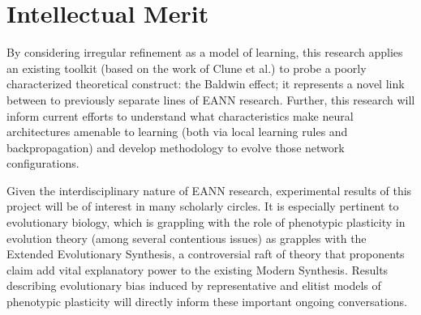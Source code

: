 \section{Intellectual Merit}
By considering irregular refinement as a model of learning, this research applies an existing toolkit (based on the work of Clune et al.) to probe a poorly characterized theoretical construct: the Baldwin effect;
it represents a novel link between to previously separate lines of EANN research.\autocite{Clune2011OnRegularity,Downing2010TheNetworks}
Further, this research will inform current efforts to understand what characteristics make neural architectures amenable to learning (both via local learning rules and backpropagation) and develop methodology to evolve those network configurations.

Given the interdisciplinary nature of EANN research, experimental results of this project will be of interest in many scholarly circles.
It is especially pertinent to evolutionary biology, which is grappling with the role of phenotypic plasticity in evolution theory (among several contentious issues) as grapples with the Extended Evolutionary Synthesis, a controversial raft of theory that proponents claim add vital explanatory power to the existing Modern Synthesis.\autocite{Pigliucci2008IsEvolvable, Laland2014DoesRethink}
Results describing evolutionary bias induced by representative and elitist models of phenotypic plasticity will directly inform these important ongoing conversations.


